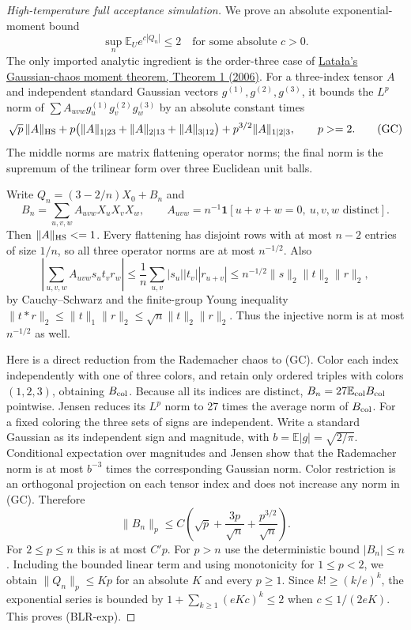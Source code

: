 \begin{proof}[High-temperature full acceptance simulation]
We prove an absolute exponential-moment bound
\[
 \sup_n\mathbb E_U e^{c|Q_n|}\le2
 \quad\text{for some absolute }c>0.
 \tag{BLR-exp}
\]
The only imported analytic ingredient is the order-three case of
\href{https://arxiv.org/pdf/math/0505313}{Lata\l a's Gaussian-chaos
moment theorem, Theorem 1 (2006)}.  For a three-index tensor $A$ and
independent standard Gaussian vectors $g^{(1)},g^{(2)},g^{(3)}$, it
bounds the $L^p$ norm of $\sum A_{uvw}g^{(1)}_ug^{(2)}_vg^{(3)}_w$ by
an absolute constant times
\[
 \sqrt p\,\|A\|_{\rm HS}
 +p\bigl(\|A\|_{1|23}+\|A\|_{2|13}+\|A\|_{3|12}\bigr)
 +p^{3/2}\|A\|_{1|2|3},\qquad p\ge2.
 \tag{GC}
\]
The middle norms are matrix flattening operator norms; the final norm
is the supremum of the trilinear form over three Euclidean unit balls.

Write $Q_n=(3-2/n)X_0+B_n$ and
\[
 B_n=\sum_{u,v,w}A_{uvw}X_uX_vX_w,
 \qquad A_{uvw}=n^{-1}\mathbf1[u+v+w=0,\ u,v,w\text{ distinct}].
\]
Then $\|A\|_{\rm HS}\le1$.  Every flattening has disjoint rows with
at most $n-2$ entries of size $1/n$, so all three operator norms are
at most $n^{-1/2}$.  Also
\[
 \left|\sum_{u,v,w}A_{uvw}s_ut_vr_w\right|
 \le\frac1n\sum_{u,v}|s_u||t_v||r_{u+v}|
 \le n^{-1/2}\|s\|_2\|t\|_2\|r\|_2,
\]
by Cauchy--Schwarz and the finite-group Young inequality
$\|t*r\|_2\le\|t\|_1\|r\|_2\le\sqrt n\|t\|_2\|r\|_2$.
Thus the injective norm is at most $n^{-1/2}$ as well.

Here is a direct reduction from the Rademacher chaos to (GC).  Color
each index independently with one of three colors, and retain only
ordered triples with colors $(1,2,3)$, obtaining $B_{\rm col}$.
Because all its indices are distinct,
$B_n=27\mathbb E_{\rm col}B_{\rm col}$ pointwise.  Jensen reduces its
$L^p$ norm to 27 times the average norm of $B_{\rm col}$.  For a fixed
coloring the three sets of signs are independent.  Write a standard
Gaussian as its independent sign and magnitude, with
$b=\mathbb E|g|=\sqrt{2/\pi}$.  Conditional expectation over magnitudes
and Jensen show that the Rademacher norm is at most $b^{-3}$ times
the corresponding Gaussian norm.  Color restriction is an orthogonal
projection on each tensor index and does not increase any norm in
(GC).  Therefore
\[
 \|B_n\|_p\le C\left(\sqrt p+\frac{3p}{\sqrt n}
                               +\frac{p^{3/2}}{\sqrt n}\right).
 \tag{BLR-moment}
\]
For $2\le p\le n$ this is at most $C'p$.  For $p>n$ use the
deterministic bound $|B_n|\le n$.  Including the bounded linear term
and using monotonicity for $1\le p<2$, we obtain
$\|Q_n\|_p\le Kp$ for an absolute $K$ and every $p\ge1$.
Since $k!\ge(k/e)^k$, the exponential series is bounded by
$1+\sum_{k\ge1}(eKc)^k\le2$ when $c\le1/(2eK)$.  This proves
(BLR-exp).


\end{proof}
